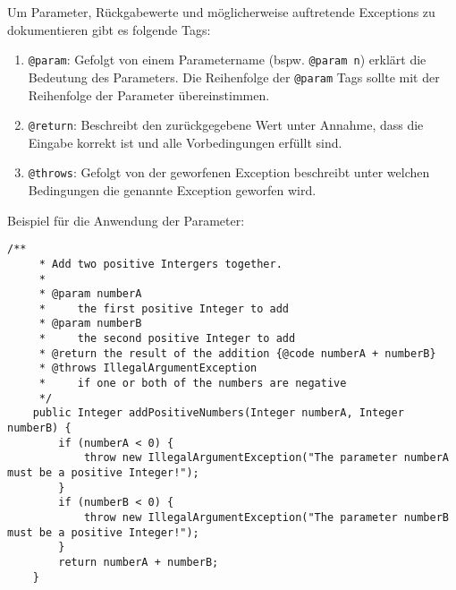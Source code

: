 \begin{Infobox}
    Um Parameter, Rückgabewerte und möglicherweise auftretende Exceptions zu dokumentieren gibt es folgende Tags:

    \begin{enumerate}[label=\roman*)]
        \item \lstinline{@param}: 
            Gefolgt von einem Parametername (bspw. \lstinline{@param n}) erklärt die Bedeutung des Parameters.
            Die Reihenfolge der \lstinline{@param} Tags sollte mit der Reihenfolge der Parameter übereinstimmen.
        \item \lstinline{@return}: 
            Beschreibt den zurückgegebene Wert unter Annahme, dass die Eingabe korrekt ist und alle Vorbedingungen erfüllt sind.
        \item \lstinline{@throws}: 
            Gefolgt von der geworfenen Exception beschreibt unter welchen Bedingungen die genannte Exception geworfen wird.
    \end{enumerate}

    Beispiel für die Anwendung der Parameter:

    \begin{lstlisting}[numbers=none]
    /**
     * Add two positive Intergers together.
     * 
     * @param numberA
     *     the first positive Integer to add
     * @param numberB
     *     the second positive Integer to add
     * @return the result of the addition {@code numberA + numberB}
     * @throws IllegalArgumentException
     *     if one or both of the numbers are negative
     */
    public Integer addPositiveNumbers(Integer numberA, Integer numberB) {
        if (numberA < 0) {
            throw new IllegalArgumentException("The parameter numberA must be a positive Integer!");
        }
        if (numberB < 0) {
            throw new IllegalArgumentException("The parameter numberB must be a positive Integer!");
        }
        return numberA + numberB;
    }
    \end{lstlisting}
\end{Infobox}
